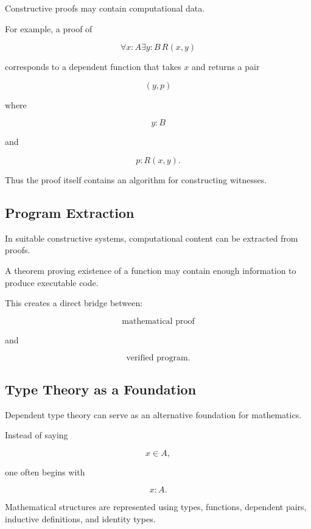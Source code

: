 Constructive proofs may contain computational data.

For example, a proof of

\[
\boxed{
\forall x:A
\exists y:B
\,
R(x,y)
}
\]

corresponds to a dependent function that takes \(x\) and returns a pair

\[
\boxed{
(y,p)
}
\]

where

\[
y:B
\]

and

\[
p:R(x,y).
\]

Thus the proof itself contains an algorithm for constructing witnesses.

\subsection{Program Extraction}
\label{subsec:program-extraction}

In suitable constructive systems, computational content can be extracted
from proofs.

A theorem proving existence of a function may contain enough information to
produce executable code.

This creates a direct bridge between:

\[
\boxed{
\text{mathematical proof}
}
\]

and

\[
\boxed{
\text{verified program}.
}
\]

\subsection{Type Theory as a Foundation}
\label{subsec:type-theory-foundation}

Dependent type theory can serve as an alternative foundation for
mathematics.

Instead of saying

\[
x\in A,
\]

one often begins with

\[
\boxed{
x:A.
}
\]

Mathematical structures are represented using types, functions, dependent
pairs, inductive definitions, and identity types.


